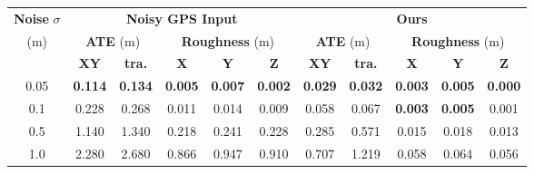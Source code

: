 
\begin{table}[h!]
    \centering
    {\small
        \begin{tabular}{c|ccccc|ccccc}
            \hline
            \textbf{Noise} $\sigma$ & \multicolumn{5}{c|}{\textbf{Noisy GPS Input}} & \multicolumn{5}{c}{\textbf{Ours}}                                                                                                                                                                                                     \\
            (m)                     & \multicolumn{2}{c}{\textbf{ATE} (m)}          & \multicolumn{3}{c|}{\textbf{Roughness} (m)} & \multicolumn{2}{c}{\textbf{ATE} (m)} & \multicolumn{3}{c}{\textbf{Roughness} (m)}                                                                                                       \\
                                    & \textbf{XY}                                   & \textbf{tra.}                               & \textbf{X}                           & \textbf{Y}                                 & \textbf{Z}     & \textbf{XY}    & \textbf{tra.}  & \textbf{X}     & \textbf{Y}     & \textbf{Z}     \\
            \hline
            \hline
            0.05                    & \textbf{0.114}                                & \textbf{0.134}                              & \textbf{0.005}                       & \textbf{0.007}                             & \textbf{0.002} & \textbf{0.029} & \textbf{0.032} & \textbf{0.003} & \textbf{0.005} & \textbf{0.000} \\
            0.1                     & 0.228                                         & 0.268                                       & 0.011                                & 0.014                                      & 0.009          & 0.058          & 0.067          & \textbf{0.003} & \textbf{0.005} & 0.001          \\
            0.5                     & 1.140                                         & 1.340                                       & 0.218                                & 0.241                                      & 0.228          & 0.285          & 0.571          & 0.015          & 0.018          & 0.013          \\
            1.0                     & 2.280                                         & 2.680                                       & 0.866                                & 0.947                                      & 0.910          & 0.707          & 1.219          & 0.058          & 0.064          & 0.056          \\

\end{tabular}}
\end{table}

